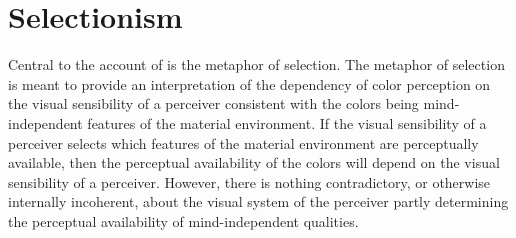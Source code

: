 \documentclass[12pt]{article}
\begin{document}
\section{Selectionism}\label{sec:selectionism} 

Central to the account of \cite{Hilbert:2000on} is the metaphor of selection. The metaphor of selection is meant to provide an interpretation of the dependency of color perception on the visual sensibility of a perceiver consistent with the colors being mind-independent features of the material environment. If the visual sensibility of a perceiver selects which features of the material environment are perceptually available, then the perceptual availability of the colors will depend on the visual sensibility of a perceiver. However, there is nothing contradictory, or otherwise internally incoherent, about the visual system of the perceiver partly determining the perceptual availability of mind-independent qualities. \citep[See][39--53.]{Price:1932fk}
\end{document}

